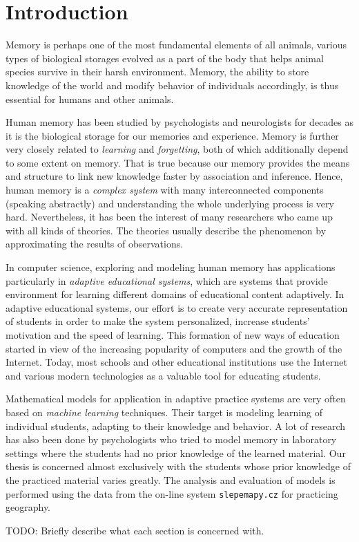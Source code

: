 \chapter{Introduction}

Memory is perhaps one of the most fundamental elements of all animals, various types of biological storages evolved as a part of the body that helps animal species survive in their harsh environment. Memory, the ability to store knowledge of the world and modify behavior of individuals accordingly, is thus essential for humans and other animals.

Human memory has been studied by psychologists and neurologists for decades as it is the biological storage for our memories and experience. Memory is further very closely related to \textit{learning} and \textit{forgetting}, both of which additionally depend to some extent on memory. That is true because our memory provides the means and structure to link new knowledge faster by association and inference. Hence, human memory is a \textit{complex system} with many interconnected components (speaking abstractly) and understanding the whole underlying process is very hard. Nevertheless, it has been the interest of many researchers who came up with all kinds of theories. The theories usually describe the phenomenon by approximating the results of observations.

In computer science, exploring and modeling human memory has applications particularly in \textit{adaptive educational systems}, which are systems that provide environment for learning different domains of educational content adaptively. In adaptive educational systems, our effort is to create very accurate representation of students in order to make the system personalized, increase students' motivation and the speed of learning. This formation of new ways of education started in view of the increasing popularity of computers and the growth of the Internet. Today, most schools and other educational institutions use the Internet and various modern technologies as a valuable tool for educating students.

Mathematical models for application in adaptive practice systems are very often based on \textit{machine learning} techniques. Their target is modeling learning of individual students, adapting to their knowledge and behavior. A lot of research has also been done by psychologists who tried to model memory in laboratory settings where the students had no prior knowledge of the learned material. Our thesis is concerned almost exclusively with the students whose prior knowledge of the practiced material varies greatly. The analysis and evaluation of models is performed using the data from the on-line system \texttt{slepemapy.cz} for practicing geography.

TODO: Briefly describe what each section is concerned with.
